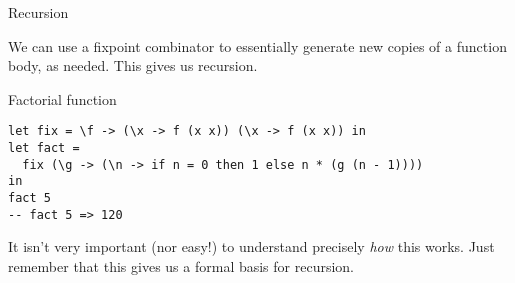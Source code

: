 %
\begin{frame}[fragile]{Recursion}

We can use a fixpoint combinator to essentially generate new copies of a
function body, as needed. This gives us recursion.

\begin{block}{Factorial function}
\begin{verbatim}
let fix = \f -> (\x -> f (x x)) (\x -> f (x x)) in 
let fact = 
  fix (\g -> (\n -> if n = 0 then 1 else n * (g (n - 1)))) 
in
fact 5
-- fact 5 => 120
\end{verbatim}
\end{block}

It isn't very important (nor easy!) to understand precisely \emph{how} this
works. Just remember that this gives us a formal basis for recursion.

\end{frame}
